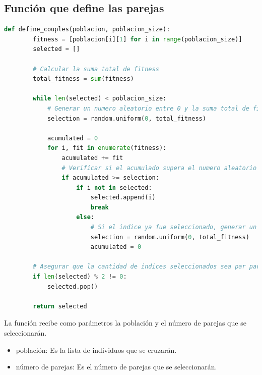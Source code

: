 \documentclass{report}
\begin{document}
    \subsection*{Función que define las parejas}
    \begin{lstlisting}[language=Python, style=mystyle, caption={Funcion parejas}]
    def define_couples(poblacion, poblacion_size):
        fitness = [poblacion[i][1] for i in range(poblacion_size)]
        selected = []
    
        # Calcular la suma total de fitness
        total_fitness = sum(fitness)
    
        while len(selected) < poblacion_size:
            # Generar un numero aleatorio entre 0 y la suma total de fitness
            selection = random.uniform(0, total_fitness)
            
            acumulated = 0
            for i, fit in enumerate(fitness):
                acumulated += fit
                # Verificar si el acumulado supera el numero aleatorio y si el indice no ha sido seleccionado previamente
                if acumulated >= selection:
                    if i not in selected:
                        selected.append(i)
                        break
                    else:
                        # Si el indice ya fue seleccionado, generar un nuevo numero aleatorio y reiniciar el proceso
                        selection = random.uniform(0, total_fitness)
                        acumulated = 0
    
        # Asegurar que la cantidad de indices seleccionados sea par para formar parejas
        if len(selected) % 2 != 0:
            selected.pop()
    
        return selected
    \end{lstlisting}
    La función recibe como parámetros la población y el número de parejas que se seleccionarán. 

    \begin{itemize}
        \item población: Es la lista de individuos que se cruzarán.
        \item número de parejas: Es el número de parejas que se seleccionarán.
    \end{itemize}
    
\end{document}
